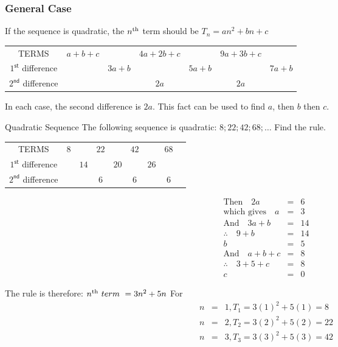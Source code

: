 \subsubsection{General Case}
If the sequence is quadratic, the $n^{\rm th}$ term should be $T_n = an^2 + bn + c$

\begin{center}
\begin{tabular}{ccccccc}
TERMS & $a+b+c$ && $4a+2b+c$ && $9a+3b+c$ & \\
$1^{\textsf{st}}$ difference && $3a+b$ && $5a+b$ && $7a+b$ \\ 
$2^{\textsf{nd}}$ difference &&& $2a$ && $2a$ & \\
\end{tabular}
\end{center}

In each case, the second difference is $2a$.
This fact can be used to find $a$, then $b$ then $c$.

\begin{wex}{Quadratic Sequence}
{The following sequence is quadratic: $8; 22; 42; 68; \ldots$
Find the rule.}{
\begin{center}
\begin{tabular}{ccccccccc}
TERMS & $8$ && $22$ && $42$ && $68$ & \\
$1^{\textsf{st}}$ difference && $14$ && $20$ && $26$ \\ 
$2^{\textsf{nd}}$ difference &&& $6$ && $6$ && $6$ & \\
\end{tabular}
\end{center}

\begin{eqnarray*}
\textrm{Then} \quad  2a &=& 6 \\
\textrm{which gives} \quad a &=& 3\\
\textrm{And} \quad  3a + b &=& 14\\   
\therefore \quad 9 + b &=& 14  \\
 b &=& 5\\
\textrm{And} \quad  a + b + c  &=& 8\\  
\therefore \quad 3 + 5 + c &=& 8\\
 c &=& 0
\end{eqnarray*}

The rule is therefore: \quad $n^{\rm th} ~term~ = 3n^2 + 5n$
For
\begin{eqnarray*}
n &=& 1, T_1 = 3(1)^2 + 5(1) = 8\\
n &=& 2, T_2 = 3(2)^2 + 5(2) = 22\\
n &=& 3, T_3 = 3(3)^2 + 5(3) = 42
\end{eqnarray*}
}
\end{wex}


